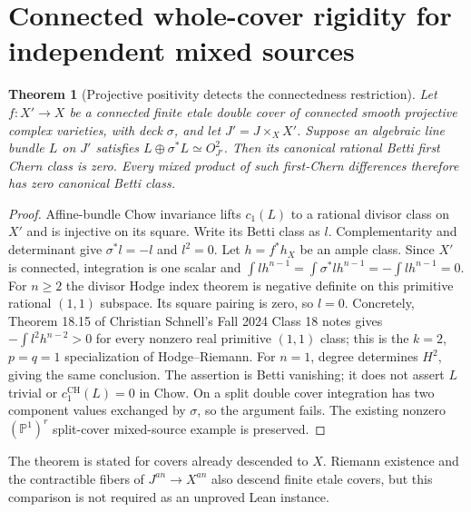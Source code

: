 \documentclass[11pt]{article}
\newtheorem{theorem}{Theorem}[section]
\newcommand{\CH}{\operatorname{CH}}
\begin{document}
\section{Connected whole-cover rigidity for independent mixed sources}
\begin{theorem}[Projective positivity detects the connectedness restriction]
Let $f:X'\to X$ be a connected finite etale double cover of connected smooth
projective complex varieties, with deck $\sigma$, and let $J'=J\times_X X'$.
Suppose an algebraic line bundle $L$ on $J'$ satisfies
$L\oplus\sigma^*L\simeq O_{J'}^2$. Then its canonical rational Betti first
Chern class is zero. Every mixed product of such first-Chern differences
therefore has zero canonical Betti class.
\end{theorem}
\begin{proof}
Affine-bundle Chow invariance lifts $c_1(L)$ to a rational divisor class on
$X'$ and is injective on its square. Write its Betti class as $l$.
Complementarity and determinant give $\sigma^*l=-l$ and $l^2=0$.
Let $h=f^*h_X$ be an ample class. Since $X'$ is connected, integration is
one scalar and $\int l h^{n-1}=\int\sigma^*l h^{n-1}=-\int l h^{n-1}=0$.
For $n\ge2$ the divisor Hodge index theorem is negative definite on this
primitive rational $(1,1)$ subspace. Its square pairing is zero, so $l=0$.
Concretely, Theorem 18.15 of Christian Schnell's Fall 2024 Class 18 notes
gives $-\int l^2h^{n-2}>0$ for every nonzero real primitive $(1,1)$ class;
this is the $k=2$, $p=q=1$ specialization of Hodge--Riemann.
For $n=1$, degree determines $H^2$, giving the same conclusion.
The assertion is Betti vanishing; it does not assert $L$ trivial or
$c_1^{\CH}(L)=0$ in Chow. On a split double cover integration has two
component values exchanged by $\sigma$, so the argument fails. The existing
nonzero $(\mathbb P^1)^r$ split-cover mixed-source example is preserved.
\end{proof}
The theorem is stated for covers already descended to $X$. Riemann existence
and the contractible fibers of $J^{an}\to X^{an}$ also descend finite etale
covers, but this comparison is not required as an unproved Lean instance.
\end{document}

